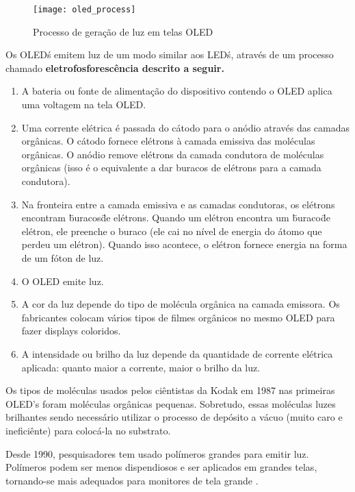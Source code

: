 \begin{figure}[!h]
  \centering
  \texttt{[image: oled\_process]} 
  \caption{Processo de geração de luz em telas OLED}
  \label{fig:oled_process} 
\end{figure}

Os OLED\'s emitem luz de um modo similar aos LED\'s, através de um processo chamado \bf{eletrofosforescência} descrito a seguir. 

\begin{enumerate}

	\item A bateria ou fonte de alimentação do dispositivo contendo o OLED aplica uma voltagem na tela OLED. 

	\item Uma corrente elétrica é passada do cátodo para o anódio através das camadas orgânicas. O cátodo fornece elétrons à camada emissiva das moléculas orgânicas. O anódio remove elétrons da camada condutora de moléculas orgânicas (isso é o equivalente a dar buracos de elétrons para a camada condutora).

	\item Na fronteira entre a camada emissiva e as camadas condutoras, os elétrons encontram \"buracos\" de elétrons. Quando um elétron encontra um \"buraco\" de elétron, ele preenche o buraco (ele cai no nível de energia do átomo que perdeu um elétron). Quando isso acontece, o elétron fornece energia na forma de um fóton de luz. 

	\item O OLED emite luz. 

	\item A cor da luz depende do tipo de molécula orgânica na camada emissora. Os fabricantes colocam vários tipos de filmes orgânicos no mesmo OLED para fazer displays coloridos.

	\item A intensidade ou brilho da luz depende da quantidade de corrente elétrica aplicada: quanto maior a corrente, maior o brilho da luz.
\end{enumerate}

Os tipos de moléculas usados pelos ciêntistas da Kodak em 1987 nas primeiras OLED's foram moléculas orgânicas pequenas. Sobretudo, essas moléculas luzes brilhantes sendo necessário utilizar o processo de depósito a vácuo (muito caro e ineficiênte) para colocá-la no substrato. 

Desde 1990, pesquisadores tem usado polímeros grandes para emitir luz. Polímeros podem ser menos dispendiosos e ser aplicados em grandes telas, tornando-se mais adequados para monitores de tela grande \cite{HSWOLED}.


